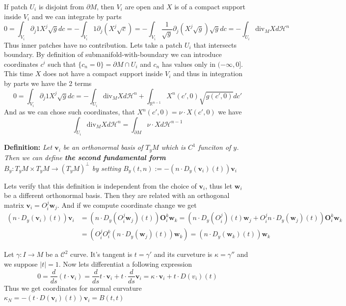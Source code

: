 \vspace{1ex}
If patch $U_i$ is disjoint from $\partial M$, then $V_i$ are open and $X$ is of
a compact support inside $V_i$ and we can integrate by parts
\[0=\int_{V_i}\partial_j 1X^j\sqrt gdc=-\int_{V_i}1\partial_j(X^j\sqrt c)=
-\int_{V_i}\frac{1}{\sqrt g}\partial_j(X^j\sqrt g)\sqrt gdc=-\int_{U_i}\text{div}_M Xd\mathcal H^n\]
Thus inner patches have no contribution. Lets take a patch $U_i$ that intersects
boundary. By definition of submanifold-with-boundary we can introduce coordinates
$c^i$ such that $\{c_n=0\}=\partial M\cap U_i$ and $c_n$ has values only in
$(-\infty,0]$. This time $X$ does not have a compact support inside $V_i$ and
thus in integration by parts we have the 2 terms
\[0=\int_{V_i}\partial_j 1X^j\sqrt gdc=-\int_{U_i}\text{div}_M Xd\mathcal H^n+\int_{\mathbb R^{n-1}}X^n(c',0)\sqrt{g(c',0)}dc'\]
And as we can chose such coordinates, that $X^n(c',0)=\nu\cdot X(c',0)$ we have
\[\int_{U_i}\text{div}_M Xd\mathcal H^n=\int_{\partial M}\nu\cdot Xd\mathcal H^{n-1}\]

\vspace{2ex}
\textbf{Definition:} \textit{Let $\mathbf{v}_i$ be an orthonormal basis of $T_yM$ which
is $C^1$ funciton of $y$. Then we can define \textbf{the second fundamental form}
$B_y:T_yM\times T_yM\rightarrow (T_yM)^\perp$ by setting $B_y(t,n):=-(n\cdot D_y
(\mathbf v_i)(t))\mathbf v_i$
}

\vspace{2ex} Lets verify that this definition is independent from the choice of
$\mathbf v_i$, thus let $\mathbf w_i$ be a different orthonormal basis. Then
they are related with an orthogonal matrix $\mathbf v_i=O_i^j\mathbf w_j$. And
if we compute coordinate change we get
\begin{align*}
    (n\cdot D_y(\mathbf v_i)(t))\mathbf v_i&=(n\cdot D_y(O_i^j\mathbf w_j)(t))\mathbf O_i^k\mathbf w_k
=(n\cdot D_y(O_i^j)(t)\mathbf w_j + O_i^j n\cdot D_y(\mathbf w_j)(t))\mathbf O_i^k\mathbf w_k\\
    &=(O_i^jO_i^k(n\cdot D_y(\mathbf w_j)(t))\mathbf w_k)=(n\cdot D_y(\mathbf w_k)(t))\mathbf w_k
\end{align*}

\vspace{2ex}
Let $\gamma:I\rightarrow M$ be a $\mathcal C^2$ curve. It's tangent is $t=\gamma'$
and its curveture is $\kappa=\gamma''$ and we suppose $|t|=1$. Now lets
differentiat a following expression
\[0=\frac{d}{ds}(t\cdot\mathbf v_i)=\frac{d}{ds}t\cdot\mathbf v_i+t\cdot\frac{d}{ds}\mathbf v_i=\kappa\cdot\mathbf v_i+t\cdot D(v_i)(t)\]
Thus we get coordinates for normal curvature
$\kappa_N = -(t\cdot D(\mathbf v_i)(t))\mathbf v_i=B(t,t)$

